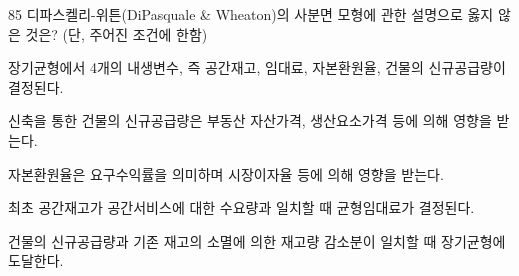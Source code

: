 \begin{question}{85}
디파스켈리-위튼(DiPasquale \& Wheaton)의 사분면 모형에 관한 설명으로 옳지 않은 것은? (단, 주어진 조건에 한함)
\begin{choices}
  \item 장기균형에서 4개의 내생변수, 즉 공간재고, 임대료, 자본환원율, 건물의 신규공급량이 결정된다.
  \item 신축을 통한 건물의 신규공급량은 부동산 자산가격, 생산요소가격 등에 의해 영향을 받는다.
  \item 자본환원율은 요구수익률을 의미하며 시장이자율 등에 의해 영향을 받는다.
  \item 최초 공간재고가 공간서비스에 대한 수요량과 일치할 때 균형임대료가 결정된다.
  \item 건물의 신규공급량과 기존 재고의 소멸에 의한 재고량 감소분이 일치할 때 장기균형에 도달한다.
\end{choices}
\end{question}
